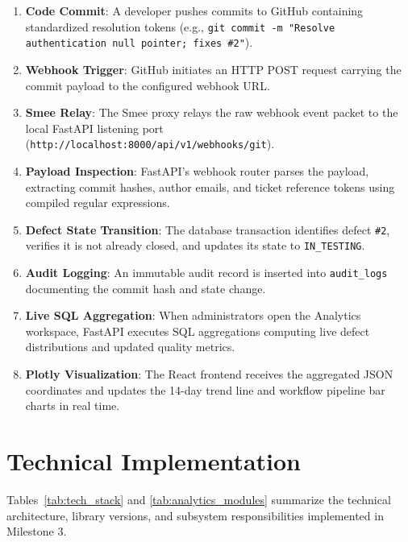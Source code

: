 \documentclass[11pt,a4paper]{article}
\begin{document}
\begin{enumerate}
    \item \textbf{Code Commit}: A developer pushes commits to GitHub containing standardized resolution tokens (e.g., \texttt{git commit -m "Resolve authentication null pointer; fixes \#2"}).
    \item \textbf{Webhook Trigger}: GitHub initiates an HTTP POST request carrying the commit payload to the configured webhook URL.
    \item \textbf{Smee Relay}: The Smee proxy relays the raw webhook event packet to the local FastAPI listening port (\texttt{http://localhost:8000/api/v1/webhooks/git}).
    \item \textbf{Payload Inspection}: FastAPI's webhook router parses the payload, extracting commit hashes, author emails, and ticket reference tokens using compiled regular expressions.
    \item \textbf{Defect State Transition}: The database transaction identifies defect \texttt{\#2}, verifies it is not already closed, and updates its state to \texttt{IN\_TESTING}.
    \item \textbf{Audit Logging}: An immutable audit record is inserted into \texttt{audit\_logs} documenting the commit hash and state change.
    \item \textbf{Live SQL Aggregation}: When administrators open the Analytics workspace, FastAPI executes SQL aggregations computing live defect distributions and updated quality metrics.
    \item \textbf{Plotly Visualization}: The React frontend receives the aggregated JSON coordinates and updates the 14-day trend line and workflow pipeline bar charts in real time.
\end{enumerate}

\section{Technical Implementation}
Tables~\ref{tab:tech_stack} and \ref{tab:analytics_modules} summarize the technical architecture, library versions, and subsystem responsibilities implemented in Milestone 3.
\end{document}
